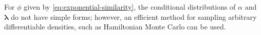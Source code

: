\documentclass[12pt,letterpaper]{report}
\newcommand{\blambda}{\boldsymbol{\lambda}}
\begin{document}
For $\phi$ given by
\eqref{eq:exponential-similarity}, the conditional distributions of
$\alpha$ and $\blambda$ do not have simple forms; however, an
efficient method for sampling arbitrary differentiable densities, such
as Hamiltonian Monte Carlo can be used.  



\end{document}
